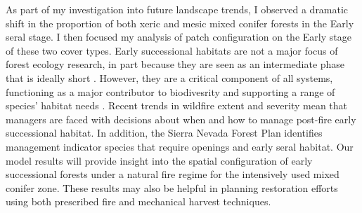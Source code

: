 As part of my investigation into future landscape trends, I observed a dramatic shift in the proportion of both xeric and mesic mixed conifer forests in the Early seral stage. I then focused my analysis of patch configuration on the Early stage of these two cover types. Early successional habitats are not a major focus of forest ecology research, in part because they are seen as an intermediate phase that is ideally short \citep{Swanson2011}. However, they are a critical component of all systems, functioning as a major contributor to biodivesrity and supporting a range of species' habitat needs \citep{Chang1995,Hutto2008,Swanson2011}. Recent trends in wildfire extent and severity mean that managers are faced with decisions about when and how to manage post-fire early successional habitat. In addition, the Sierra Nevada Forest Plan identifies management indicator species that require openings and early seral habitat. Our model results will provide insight into the spatial configuration of early successional forests under a natural fire regime for the intensively used mixed conifer zone. These results may also be helpful in planning restoration efforts using both prescribed fire and mechanical harvest techniques.





